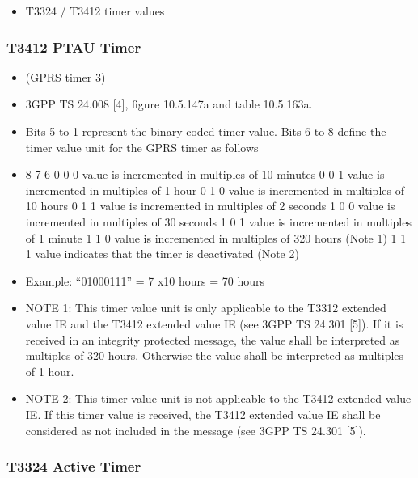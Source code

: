 \documentclass[]{article}
\providecommand{\tightlist}{%
  \setlength{\itemsep}{0pt}\setlength{\parskip}{0pt}}
\begin{document}
\begin{itemize}
\tightlist
\item
  T3324 / T3412 timer values
\end{itemize}

\hypertarget{t3412-ptau-timer}{%
\subsubsection{T3412 PTAU Timer}\label{t3412-ptau-timer}}

\begin{itemize}
\item
  (GPRS timer 3)
\item
  3GPP TS 24.008 {[}4{]}, figure 10.5.147a and table 10.5.163a.
\item
  Bits 5 to 1 represent the binary coded timer value. Bits 6 to 8 define
  the timer value unit for the GPRS timer as follows
\item
  8 7 6 0 0 0 value is incremented in multiples of 10 minutes 0 0 1
  value is incremented in multiples of 1 hour 0 1 0 value is incremented
  in multiples of 10 hours 0 1 1 value is incremented in multiples of 2
  seconds 1 0 0 value is incremented in multiples of 30 seconds 1 0 1
  value is incremented in multiples of 1 minute 1 1 0 value is
  incremented in multiples of 320 hours (Note 1) 1 1 1 value indicates
  that the timer is deactivated (Note 2)
\item
  Example: ``01000111'' = 7 x10 hours = 70 hours
\item
  NOTE 1: This timer value unit is only applicable to the T3312 extended
  value IE and the T3412 extended value IE (see 3GPP TS 24.301 {[}5{]}).
  If it is received in an integrity protected message, the value shall
  be interpreted as multiples of 320 hours. Otherwise the value shall be
  interpreted as multiples of 1 hour.
\item
  NOTE 2: This timer value unit is not applicable to the T3412 extended
  value IE. If this timer value is received, the T3412 extended value IE
  shall be considered as not included in the message (see 3GPP TS 24.301
  {[}5{]}).
\end{itemize}

\hypertarget{t3324-active-timer}{%
\subsubsection{T3324 Active Timer}\label{t3324-active-timer}}
\end{document}
